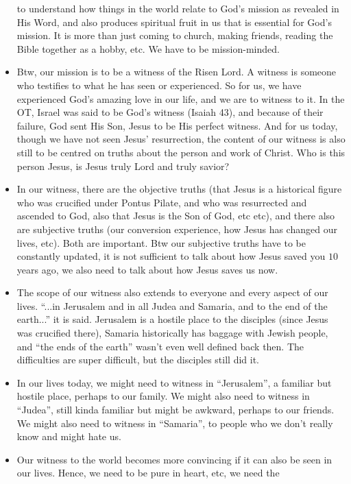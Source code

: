 \begin{itemize}
{  to understand how things in the world relate to God's mission as revealed
  in His Word, and also produces spiritual fruit in us that is essential for
  God's mission.  It is more than just coming to church, making friends,
  reading the Bible together as a hobby, etc.  We have to be mission-minded.}
  \item{Btw, our mission is to be a witness of the Risen Lord.  A witness is
  someone who testifies to what he has seen or experienced.  So for us, we
  have experienced God's amazing love in our life, and we are to witness to
  it.  In the OT, Israel was said to be God's witness (Isaiah 43), and
  because of their failure, God sent His Son, Jesus to be His perfect
  witness.  And for us today, though we have not seen Jesus' resurrection,
  the content of our witness is also still to be centred on truths about the
  person and work of Christ.  Who is this person Jesus, is Jesus truly Lord
  and truly savior?}
  \item{In our witness, there are the objective truths (that Jesus is a
  historical figure who was crucified under Pontus Pilate, and who was
  resurrected and ascended to God, also that Jesus is the Son of God, etc
  etc), and there also are subjective truths (our conversion experience, how
  Jesus has changed our lives, etc).  Both are important.  Btw our subjective
  truths have to be constantly updated, it is not sufficient to talk about
  how Jesus saved you $10$ years ago, we also need to talk about how Jesus
  saves us now.}
  \item{The scope of our witness also extends to everyone and every aspect of
  our lives.  ``...in Jerusalem and in all Judea and Samaria, and to the end
  of the earth...'' it is said.  Jerusalem is a hostile place to the
  disciples (since Jesus was crucified there), Samaria historically has
  baggage with Jewish people, and ``the ends of the earth'' wasn't even well
  defined back then.  The difficulties are super difficult, but the disciples
  still did it.}
  \item{In our lives today, we might need to witness in ``Jerusalem'', a
  familiar but hostile place, perhaps to our family.  We might also need to
  witness in ``Judea'', still kinda familiar but might be awkward, perhaps to
  our friends.  We might also need to witness in ``Samaria'', to people who
  we don't really know and might hate us.}
  \item{Our witness to the world becomes more convincing if it can also be
  seen in our lives.  Hence, we need to be pure in heart, etc, we need the
}
\end{itemize}
